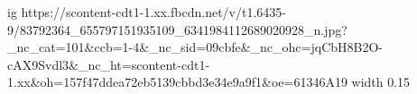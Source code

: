  
 
 
 
 

\par
\ifcmt
  ig https://scontent-cdt1-1.xx.fbcdn.net/v/t1.6435-9/83792364_655797151935109_6341984112689020928_n.jpg?_nc_cat=101&ccb=1-4&_nc_sid=09cbfe&_nc_ohc=jqCbH8B2O-cAX9Svdl3&_nc_ht=scontent-cdt1-1.xx&oh=157f47ddea72eb5139cbbd3e34e9a9f1&oe=61346A19
  width 0.15
\fi
